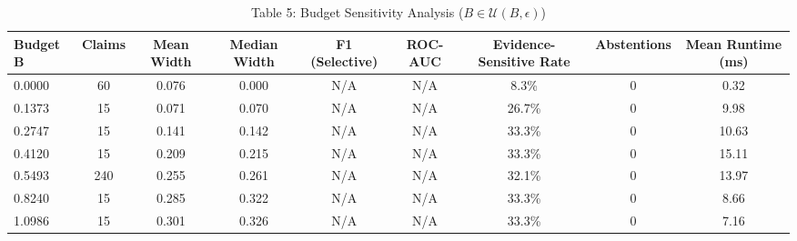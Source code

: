 \begin{table}[htbp]
\centering
\caption{Table 5: Budget Sensitivity Analysis ($B \in \mathcal{U}(B, \epsilon)$)}
\label{tab:table5_budget_sensitivity}
\begin{tabular}{lcccccccc}
\hline
Budget B & Claims & Mean Width & Median Width & F1 (Selective) & ROC-AUC & Evidence-Sensitive Rate & Abstentions & Mean Runtime (ms) \\
\hline
0.0000 & 60 & 0.076 & 0.000 & N/A & N/A & 8.3\% & 0 & 0.32 \\
0.1373 & 15 & 0.071 & 0.070 & N/A & N/A & 26.7\% & 0 & 9.98 \\
0.2747 & 15 & 0.141 & 0.142 & N/A & N/A & 33.3\% & 0 & 10.63 \\
0.4120 & 15 & 0.209 & 0.215 & N/A & N/A & 33.3\% & 0 & 15.11 \\
0.5493 & 240 & 0.255 & 0.261 & N/A & N/A & 32.1\% & 0 & 13.97 \\
0.8240 & 15 & 0.285 & 0.322 & N/A & N/A & 33.3\% & 0 & 8.66 \\
1.0986 & 15 & 0.301 & 0.326 & N/A & N/A & 33.3\% & 0 & 7.16 \\
\hline
\end{tabular}
\end{table}